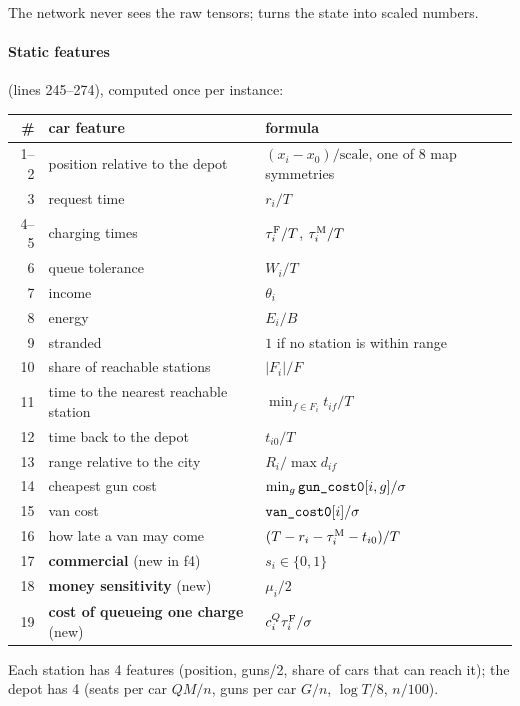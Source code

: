 The network never sees the raw tensors;  turns the state into scaled numbers.

\paragraph{Static features} (lines 245--274), computed once per instance:


{\small
\begin{longtable}{@{}r>{\raggedright\arraybackslash}p{6.6cm}>{\raggedright\arraybackslash}p{8.0cm}@{}}
\toprule
\# & car feature & formula \\
\midrule
\endhead
1--2 & position relative to the depot & $(x_i-x_0)/\text{scale}$, one of 8 map symmetries \\
3 & request time & $r_i/T$ \\
4--5 & charging times & $\tau^{\mathrm{F}}_i/T$, $\tau^{\mathrm{M}}_i/T$ \\
6 & queue tolerance & $W_i/T$ \\
7 & income & $\theta_i$ \\
8 & energy & $E_i/B$ \\
9 & stranded & $1$ if no station is within range \\
10 & share of reachable stations & $|F_i|/F$ \\
11 & time to the nearest reachable station & $\min_{f\in F_i}t_{if}/T$ \\
12 & time back to the depot & $t_{i0}/T$ \\
13 & range relative to the city & $R_i/\max d_{if}$ \\
14 & cheapest gun cost & $\min_g\text{\texttt{gun\_cost0}}[i,g]/\sigma$ \\
15 & van cost & $\text{\texttt{van\_cost0}}[i]/\sigma$ \\
16 & how late a van may come & $(T-r_i-\tau^{\mathrm{M}}_i-t_{i0})/T$ \\
17 & \textbf{commercial} (new in f4) & $s_i\in\{0,1\}$ \\
18 & \textbf{money sensitivity} (new) & $\mu_i/2$ \\
19 & \textbf{cost of queueing one charge} (new) & $c^Q_i\tau^{\mathrm{F}}_i/\sigma$ \\
\bottomrule
\end{longtable}}
Each station has 4 features (position, guns/2, share of cars that can reach it); the depot has 4 (seats per car $QM/n$, guns per car $G/n$, $\log T/8$, $n/100$).

